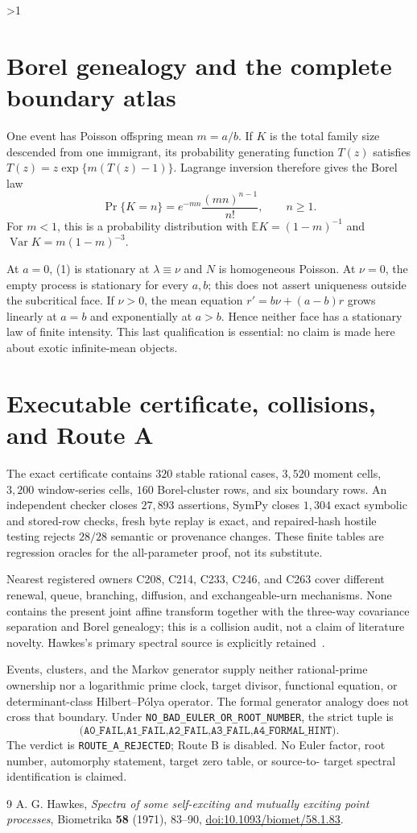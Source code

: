 \documentclass[10pt]{article}
\newcommand{\E}{\mathbb E}
\newcommand{\Var}{\operatorname{Var}}
\begin{document}
\ifnum\HAWKESROUND>1
\section{Borel genealogy and the complete boundary atlas}
One event has Poisson offspring mean $m=a/b$.  If $K$ is the total family
size descended from one immigrant, its probability generating function
$T(z)$ satisfies $T(z)=z\exp\{m(T(z)-1)\}$.  Lagrange inversion therefore
gives the Borel law
\begin{equation}
 \Pr\{K=n\}=e^{-mn}\frac{(mn)^{n-1}}{n!},\qquad n\geq1. \tag{11}
\end{equation}
For $m<1$, this is a probability distribution with
$\E K=(1-m)^{-1}$ and $\Var K=m(1-m)^{-3}$.

At $a=0$, (1) is stationary at $\lambda\equiv\nu$ and $N$ is homogeneous
Poisson.  At $\nu=0$, the empty process is stationary for every $a,b$; this
does not assert uniqueness outside the subcritical face.  If $\nu>0$, the
mean equation $r'=b\nu+(a-b)r$ grows linearly at $a=b$ and exponentially at
$a>b$.  Hence neither face has a stationary law of finite intensity.  This
last qualification is essential: no claim is made here about exotic
infinite-mean objects.

\section{Executable certificate, collisions, and Route A}
The exact certificate contains $320$ stable rational cases, $3{,}520$
moment cells, $3{,}200$ window-series cells, $160$ Borel-cluster rows, and six
boundary rows.  An independent checker closes $27{,}893$ assertions, SymPy
closes $1{,}304$ exact symbolic and stored-row checks, fresh byte replay is
exact, and repaired-hash hostile testing rejects $28/28$ semantic or
provenance changes.  These finite tables are regression oracles for the
all-parameter proof, not its substitute.

Nearest registered owners C208, C214, C233, C246, and C263 cover different
renewal, queue, branching, diffusion, and exchangeable-urn mechanisms.  None
contains the present joint affine transform together with the three-way
covariance separation and Borel genealogy; this is a collision audit, not a
claim of literature novelty.  Hawkes's primary spectral source is explicitly
retained~\cite{Hawkes1971}.

Events, clusters, and the Markov generator supply neither rational-prime
ownership nor a logarithmic prime clock, target divisor, functional equation,
or determinant-class Hilbert--P\'olya operator.  The formal generator analogy
does not cross that boundary.  Under
\texttt{NO\_BAD\_EULER\_OR\_ROOT\_NUMBER}, the strict tuple is
\[
 \texttt{(A0\_FAIL,A1\_FAIL,A2\_FAIL,A3\_FAIL,A4\_FORMAL\_HINT)}.
\]
The verdict is \texttt{ROUTE\_A\_REJECTED}; Route B is disabled.  No Euler
factor, root number, automorphy statement, target zero table, or source-to-
target spectral identification is claimed.
\fi

\begin{thebibliography}{9}
A. G. Hawkes,
\emph{Spectra of some self-exciting and mutually exciting point processes},
Biometrika \textbf{58} (1971), 83--90,
\href{https://doi.org/10.1093/biomet/58.1.83}{doi:10.1093/biomet/58.1.83}.
\end{thebibliography}
\end{document}
